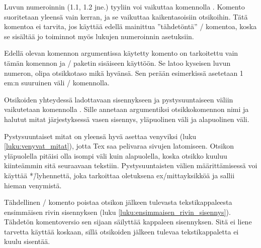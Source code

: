 Luvun numeroinnin (1.1, 1.2 jne.) tyyliin voi vaikuttaa komennolla
. Komento suoritetaan yleensä vain kerran, ja se
vaikuttaa kaikentasoisiin otsikoihin. Tätä komentoa ei tarvita, jos
käyttää edellä mainittua ''tähdetöntä'' \-/
komentoa, koska se sisältää jo toiminnot myös lukujen numeroinnin
asetuksiin.

\begin{koodilohkosis}
\titlelabel{\thetitle\hspace{1em}}
\end{koodilohkosis}

Edellä olevan komennon argumentissa käytetty komento 
on tarkoitettu vain tämän komennon ja \-/ paketin
sisäiseen käyttöön. Se latoo kyseisen luvun numeron, olipa otsikkotaso
mikä hyvänsä. Sen perään esimerkissä asetetaan 1\,em:n suuruinen väli
\-/ komennolla.

Otsikoiden yhteydessä ladottavaan sisennykseen ja pystysuuntaiseen
väliin vaikutetaan komennolla . Sille annetaan
argumentiksi otsikkokomennon nimi ja halutut mitat järjestyksessä vasen
sisennys, yläpuolinen väli ja alapuolinen väli.

\begin{koodilohkosis}
\end{koodilohkosis}

Pystysuuntaiset mitat on yleensä hyvä asettaa venyviksi (luku
\ref{luku:venyvat_mitat}), jotta Tex saa pelivaraa sivujen latomiseen.
Otsikon yläpuolella pitäisi olla isompi väli kuin alapuolella, koska
otsikko kuuluu kiinteämmin sitä seuraavaan tekstiin. Pystysuuntaisten
välien määrittämisessä voi käyttää *\=/lyhennettä, joka tarkoittaa
oletuksena ex\-/mittayksikköä ja sallii hieman venymistä.

\begin{koodilohkosis}
\end{koodilohkosis}

Tähdellinen \-/ komento poistaa otsikon jälkeen
tulevasta tekstikappaleesta ensimmäisen rivin sisennyksen (luku
\ref{luku:ensimmaisen_rivin_sisennys}). Tähdetön komentoversio
 sen sijaan säilyttää kappaleen sisennyksen. Sitä
ei liene tarvetta käyttää koskaan, sillä otsikoiden jälkeen tulevaa
tekstikappaletta ei kuulu sisentää.

